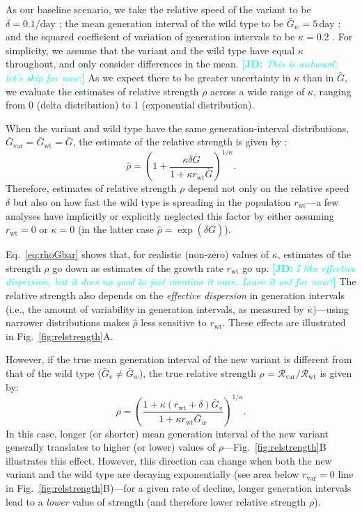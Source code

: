 \documentclass[12pt]{article}
\newcommand{\comment}{\showcomment}
\newcommand{\showcomment}[3]{\textcolor{#1}{\textbf{[#2: }\textsl{#3}\textbf{]}}}
\newcommand{\jd}[1]{\comment{cyan}{JD}{#1}}
\newcommand{\eref}[1]{Eq.~\ref{eq:#1}}
\newcommand{\fref}[1]{Fig.~\ref{fig:#1}}
\newcommand{\vvvar}{\mathrm{var}}
\newcommand{\wwwt}{\mathrm{wt}}
\newcommand{\rx}[1]{\ensuremath{{r}_{#1}}\xspace}
\newcommand{\rw}{\rx{\wwwt}}
\newcommand{\rv}{\rx{\vvvar}}
\newcommand{\Rx}[1]{\ensuremath{{\mathcal R}_{#1}}\xspace}
\newcommand{\Rw}{\Rx{\wwwt}}
\newcommand{\Rv}{\Rx{\vvvar}}
\newcommand{\days}{\ensuremath{\, \textrm{day}}}
\newcommand{\Gx}[1]{\ensuremath{{\bar G}_{#1}}\xspace}
\newcommand{\Gy}[1]{\Gx{\mathrm{#1}}}
\begin{document}
As our baseline scenario, we take the relative speed of the variant to be $\delta = 0.1/\textrm{day}$ \citep{davies2021estimated}; the mean generation interval of the wild type to be $\bar{G}_w = 5\days$ \citep{ferretti2020quantifying}; and the squared coefficient of variation of generation intervals to be $\kappa=0.2$ \citep{ferretti2020quantifying}.
For simplicity, we assume that the variant and the wild type have equal $\kappa$ throughout, and only consider differences in the mean.
\jd{This is awkward; let's skip for now:} As we expect there to be greater uncertainty in $\kappa$ than in $\bar{G}$, we evaluate the estimates of relative strength $\rho$ across a wide range of $\kappa$, ranging from 0 (delta distribution) to 1 (exponential distribution).

When the variant and wild type have the same generation-interval distributions, $\Gy{var} = \Gy{wt} = \bar{G}$, 
the estimate of the relative strength is given by \citep{park2019practical}:
\begin{equation}
\hat{\rho} = \left(1 + \frac{\kappa \delta \bar{G}}{1 + \kappa \rw \bar{G}}\right)^{1/\kappa}.
\label{eq:rhoGbar}
\end{equation}
Therefore, estimates of relative strength $\rho$ depend not only on the relative speed $\delta$ but also on how fast the wild type is spreading in the population \rw---a few analyses have implicitly or explicitly neglected this factor by either assuming $\rw = 0$ \citep{switzerland2021variant} or $\kappa = 0$ \citep{davies2021estimated} (in the latter case $\hat{\rho} = \exp(\delta \bar{G})$).

\eref{rhoGbar} shows that, for realistic (non-zero) values of $\kappa$, estimates of the strength $\rho$ go down as estimates of the growth rate $\rw$ go up. 
\jd{I like effective dispersion, but it does no good to just mention it once. Leave it out for now?}
The relative strength also depends on the \emph{effective dispersion} in generation intervals (i.e., the amount of variability in generation intervals, as measured by $\kappa$)---using narrower distributions makes $\hat{\rho}$ less sensitive to $\rw$.
These effects are illustrated in \fref{relstrength}A.

However, if the true mean generation interval of the new variant is different from that of the wild type ($\bar{G}_v \neq \bar{G}_w$), the true relative strength $\rho = \Rv/\Rw$ is given by:
\begin{equation}
\rho = \left(\frac{1 + \kappa (\rw + \delta) \bar{G}_v}{1 + \kappa \rw \bar{G}_w}\right)^{1/\kappa}.
\end{equation}
In this case, longer (or shorter) mean generation interval of the new variant generally translates to higher (or lower) values of $\rho$---\fref{relstrength}B illustrates this effect.
However, this direction can change when both the new variant and the wild type are decaying exponentially (see area below $\rv = 0$ line in \fref{relstrength}B)---for a given rate of decline, longer generation intervals lead to a \emph{lower} value of strength (and therefore lower relative strength $\rho$).
\end{document}
